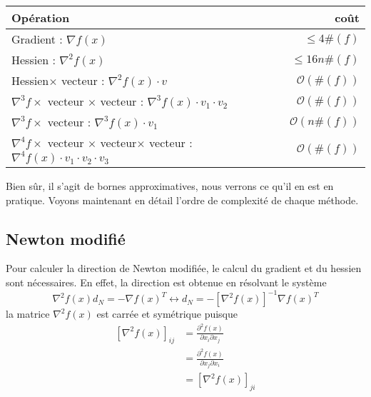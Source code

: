 \begin{center}
\begin{tabular}{|l|r|}\hline
Op\'eration  & coût \\\hline
Gradient : $\nabla f(x)$ & $\leq 4\#(f)$ \\
Hessien : $\nabla^2 f(x)$ & $\leq 16n\#(f)$ \\
Hessien$\times$ vecteur : $\nabla^2 f(x)\cdot v$ & $\mathcal{O}(\#(f))$\\
$\nabla^3 f\times$ vecteur $\times$ vecteur : $\nabla^3 f(x)\cdot v_1\cdot v_2$ & $\mathcal{O}(\#(f))$\\
$\nabla^3 f\times$ vecteur : $\nabla^3 f(x)\cdot v_1$ & $\mathcal{O}(n\#(f))$\\
$\nabla^4 f\times$ vecteur $\times$ vecteur$\times$ vecteur : $\nabla^4 f(x)\cdot v_1\cdot v_2\cdot v_3$ & $\mathcal{O}(\#(f))$\\
\hline
\end{tabular}
\end{center}

\noindent
Bien sûr, il s'agit de bornes approximatives, nous verrons ce qu'il en est en pratique. Voyons maintenant en d\'etail
l'ordre de complexit\'e de chaque m\'ethode.



\subsection{Newton modifi\'e}
Pour calculer la direction de Newton modifi\'ee, le calcul du gradient et du hessien sont
 n\'ecessaires. En effet, la direction est obtenue en r\'esolvant le syst\`eme
$$\nabla^2 f(x)d_N=-\nabla f(x)^T\leftrightarrow d_N=-\left[\nabla^2 f(x)\right]^{-1}\nabla f(x)^T$$
la matrice $\nabla^2 f(x)$ est carr\'ee et sym\'etrique puisque
 \begin{align*}
\left[\nabla^2 f(x)\right]_{ij} & =\frac{\partial^2 f(x)}{\partial x_i \partial x_j} \\
				& = \frac{\partial^2 f(x)}{\partial x_j \partial x_i} \\
				& = \left[\nabla^2 f(x)\right]_{ji}
\end{align*}


